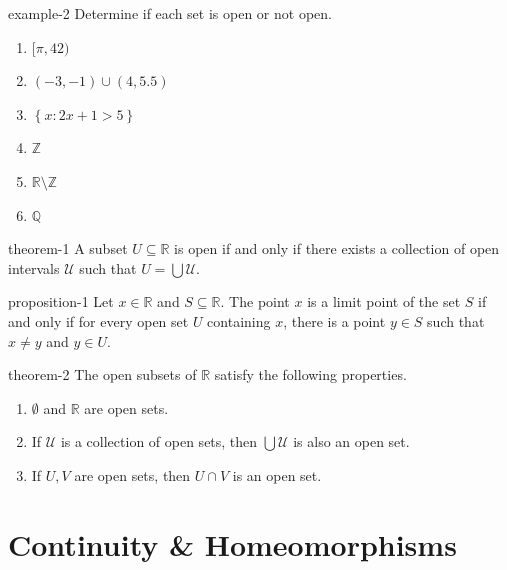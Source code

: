 \documentclass[10pt,]{article}
\newcommand{\mb}{\mathbb}
\newcommand{\mc}{\mathcal}
\newcommand{\setBuilder}[2]{\left\{#1:#2\right\}}
\begin{document}
\begin{example}{}{example-2}%
\hypertarget{p-24}{}%
Determine if each set is open or not open.%
\leavevmode%
\begin{enumerate}
\item\hypertarget{li-8}{}\([\pi,42)\)%
\item\hypertarget{li-9}{}\((-3,-1)\cup(4,5.5)\)%
\item\hypertarget{li-10}{}\(\setBuilder{x}{2x+1>5}\)%
\item\hypertarget{li-11}{}\(\mb Z\)%
\item\hypertarget{li-12}{}\(\mb R\setminus\mb Z\)%
\item\hypertarget{li-13}{}\(\mb Q\)%
\end{enumerate}
\end{example}
\begin{theorem}{}{}{theorem-1}%
\hypertarget{p-25}{}%
A subset \(U\subseteq\mb R\) is open if and only if there exists a collection of open intervals \(\mc U\) such that \(U=\bigcup\mc U\).%
\end{theorem}
\begin{proposition}{}{}{proposition-1}%
\hypertarget{p-26}{}%
Let \(x\in\mb R\) and \(S\subseteq\mb R\). The point \(x\) is a limit point of the set \(S\) if and only if for every open set \(U\) containing \(x\), there is a point \(y\in S\) such that \(x\not=y\) and \(y\in U\).%
\end{proposition}
\begin{theorem}{}{}{theorem-2}%
\hypertarget{p-27}{}%
The open subsets of \(\mb R\) satisfy the following properties.%
\leavevmode%
\begin{enumerate}
\item\hypertarget{li-14}{}\(\emptyset\) and \(\mb R\) are open sets.%
\item\hypertarget{li-15}{}If \(\mc U\) is a collection of open sets, then \(\bigcup\mc U\) is also an open set.%
\item\hypertarget{li-16}{}If \(U,V\) are open sets, then \(U\cap V\) is an open set.%
\end{enumerate}
\end{theorem}
%
%
\typeout{************************************************}
\typeout{************************************************}
%
\section[{Continuity \& Homeomorphisms}]{Continuity \& Homeomorphisms}\label{section-continuity}
%
%
\typeout{************************************************}
\typeout{************************************************}
%
\end{document}

